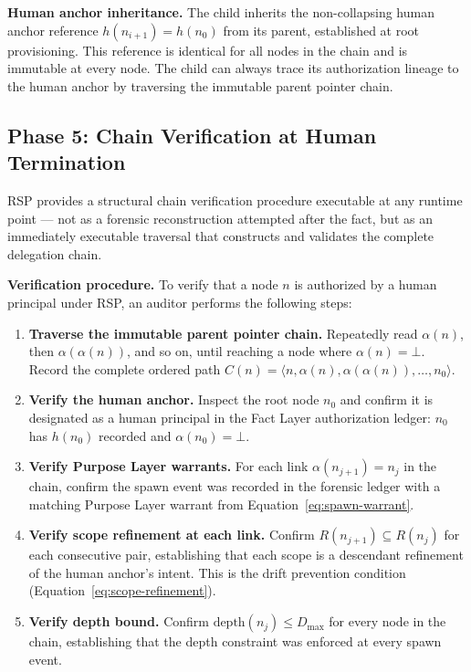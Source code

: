 \medskip
\noindent\textbf{Human anchor inheritance.} The child inherits the non-collapsing human anchor reference $h(n_{i+1}) = h(n_0)$ from its parent, established at root provisioning. This reference is identical for all nodes in the chain and is immutable at every node. The child can always trace its authorization lineage to the human anchor by traversing the immutable parent pointer chain.

\subsection{Phase 5: Chain Verification at Human Termination}
\label{sec:rs-verification}

RSP provides a structural chain verification procedure executable at any runtime point --- not as a forensic reconstruction attempted after the fact, but as an immediately executable traversal that constructs and validates the complete delegation chain.

\medskip
\noindent\textbf{Verification procedure.} To verify that a node $n$ is authorized by a human principal under RSP, an auditor performs the following steps:

\begin{enumerate}
    \item[(V1)] \textbf{Traverse the immutable parent pointer chain.} Repeatedly read $\alpha(n)$, then $\alpha(\alpha(n))$, and so on, until reaching a node where $\alpha(n) = \bot$. Record the complete ordered path $C(n) = \langle n, \alpha(n), \alpha(\alpha(n)), \ldots, n_0 \rangle$.

    \item[(V2)] \textbf{Verify the human anchor.} Inspect the root node $n_0$ and confirm it is designated as a human principal in the Fact Layer authorization ledger: $n_0$ has $h(n_0)$ recorded and $\alpha(n_0) = \bot$.

    \item[(V3)] \textbf{Verify Purpose Layer warrants.} For each link $\alpha(n_{j+1}) = n_j$ in the chain, confirm the spawn event was recorded in the forensic ledger with a matching Purpose Layer warrant from Equation~\ref{eq:spawn-warrant}.

    \item[(V4)] \textbf{Verify scope refinement at each link.} Confirm $R(n_{j+1}) \subseteq R(n_j)$ for each consecutive pair, establishing that each scope is a descendant refinement of the human anchor's intent. This is the drift prevention condition (Equation~\ref{eq:scope-refinement}).

    \item[(V5)] \textbf{Verify depth bound.} Confirm $\text{depth}(n_j) \leq D_{\max}$ for every node in the chain, establishing that the depth constraint was enforced at every spawn event.
\end{enumerate}

